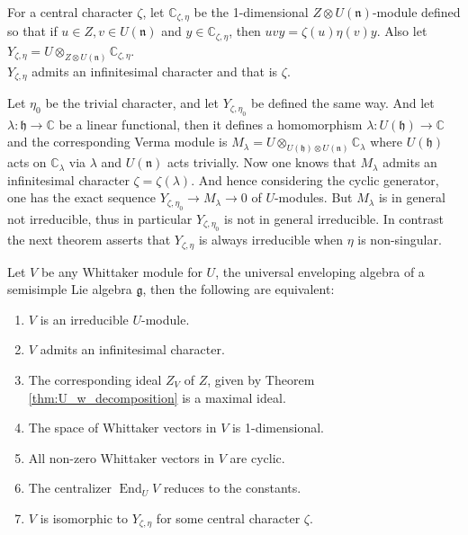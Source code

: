 \documentclass{article}
\DeclareMathOperator{\End}{End}
\theoremstyle{mytheoremstyle}
\theoremstyle{mytheoremstyle}
\theoremstyle{myproblemstyle}
\begin{document}
    For a central character $\zeta$, let $\mathbb{C}_{\zeta,\eta}$ be the 1-dimensional $Z\otimes U(\mathfrak n)$-module 
    defined so that if $u\in Z, v \in U(\mathfrak n)$ and $y \in \mathbb{C}_{\zeta,\eta}$, then $uvy = \zeta(u)\eta(v)y$.
    Also let $Y_{\zeta,\eta} = U \otimes_{Z \otimes U(\mathfrak n)} \mathbb{C}_{\zeta,\eta}$.\\

    $Y_{\zeta,\eta}$ admits an infinitesimal character and that is $\zeta$.

      Let $\eta_0$ be the trivial character, and let $Y_{\zeta,\eta_0}$ be defined the same way.
      And let $\lambda: \mathfrak{h} \to \mathbb{C}$ be a linear functional, then it defines a 
      homomorphism $\lambda: U(\mathfrak{h}) \to \mathbb{C}$ and the corresponding Verma module is
      $M_\lambda = U \otimes_{U(\mathfrak{h}) \otimes U(\mathfrak{n})} \mathbb{C}_\lambda$
      where $U(\mathfrak{h})$ acts on $\mathbb{C}_\lambda$ via $\lambda$ and $U(\mathfrak{n})$ acts trivially.
      Now one knows that $M_\lambda$ admits an infinitesimal character $\zeta = \zeta(\lambda)$. 
      And hence considering the cyclic generator, one has the exact sequence
      $Y_{\zeta,\eta_0} \to M_\lambda \to 0$ of $U$-modules.
      But $M_\lambda$ is in general not irreducible, thus in particular $Y_{\zeta,\eta_0}$ is not in general irreducible.
      In contrast the next theorem asserts that $Y_{\zeta,\eta}$ is always irreducible when $\eta$ is non-singular.

    \begin{theorem}
      Let $V$ be any Whittaker module for $U$, the universal enveloping algebra of a semisimple Lie algebra $\mathfrak{g}$, 
      then the following are equivalent:
      \begin{enumerate}
      	\item $V$ is an irreducible $U$-module.
	\item $V$ admits an infinitesimal character.
	\item The corresponding ideal $Z_V$ of $Z$, given by Theorem \ref{thm:U_w_decomposition} is a maximal ideal.
	\item The space of Whittaker vectors in $V$ is 1-dimensional.
	\item All non-zero Whittaker vectors in $V$ are cyclic.
	\item The centralizer $\End_U V$ reduces to the constants.
	\item $V$ is isomorphic to $Y_{\zeta,\eta}$ for some central character $\zeta$.
      \end{enumerate}
    \end{theorem}
\end{document}
